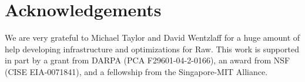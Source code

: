 \section{Acknowledgements}

We are very grateful to Michael Taylor and David Wentzlaff for a huge
amount of help developing infrastructure and optimizations for Raw.
This work is supported in part by a grant from DARPA (PCA
F29601-04-2-0166), an award from NSF (CISE EIA-0071841), and a
fellowship from the Singapore-MIT Alliance.
